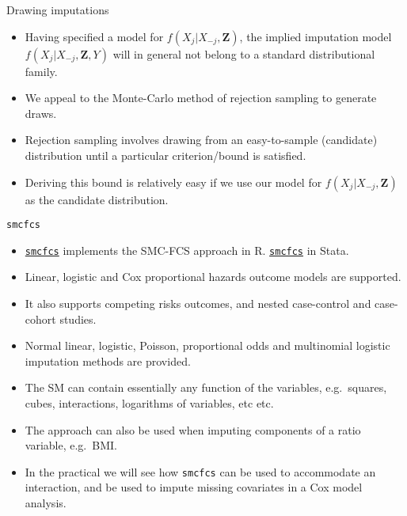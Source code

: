 \documentclass[ignorenonframetext,]{beamer}
\providecommand{\tightlist}{%
  \setlength{\itemsep}{0pt}\setlength{\parskip}{0pt}}
\begin{document}
\begin{frame}{Drawing imputations}
\protect\hypertarget{drawing-imputations}{}

\begin{itemize}
\tightlist
\item
  Having specified a model for \(f(X_{j}|X_{-j},\mathbf Z)\), the
  implied imputation model \(f(X_{j}|X_{-j},\mathbf Z,Y)\) will in
  general not belong to a standard distributional family.
\item
  We appeal to the Monte-Carlo method of rejection sampling to generate
  draws.
\item
  Rejection sampling involves drawing from an easy-to-sample (candidate)
  distribution until a particular criterion/bound is satisfied.
\item
  Deriving this bound is relatively easy if we use our model for
  \(f(X_{j}|X_{-j},\mathbf Z)\) as the candidate distribution.
\end{itemize}

\end{frame}

\begin{frame}[fragile]{\texttt{smcfcs}}
\protect\hypertarget{smcfcs}{}

\begin{itemize}
\tightlist
\item
  \href{https://cran.r-project.org/package=smcfcs}{\texttt{smcfcs}}
  implements the SMC-FCS approach in R.
  \href{https://github.com/jwb133/Stata-smcfcs}{\texttt{smcfcs}} in
  Stata.
\item
  Linear, logistic and Cox proportional hazards outcome models are
  supported.
\item
  It also supports competing risks outcomes, and nested case-control and
  case-cohort studies.
\item
  Normal linear, logistic, Poisson, proportional odds and multinomial
  logistic imputation methods are provided.
\item
  The SM can contain essentially any function of the variables,
  e.g.~squares, cubes, interactions, logarithms of variables, etc etc.
\item
  The approach can also be used when imputing components of a ratio
  variable, e.g.~BMI.
\item
  In the practical we will see how \texttt{smcfcs} can be used to
  accommodate an interaction, and be used to impute missing covariates
  in a Cox model analysis.
\end{itemize}

\end{frame}
\end{document}
